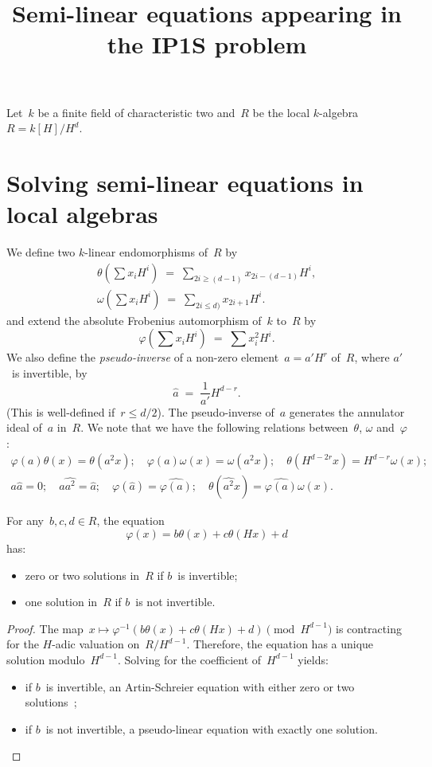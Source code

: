 \documentclass{llncs}
\begin{document}
\title{Semi-linear equations appearing in the IP1S problem}

Let~$k$ be a finite field of characteristic two and~$R$ be the local
$k$-algebra $R = k[H]/H^d$.
\section{Solving semi-linear equations in local algebras}%
We define two $k$-linear endomorphisms of~$R$
by
\begin{gather*}
θ(∑ x_i H^i) \;=\; ∑_{2i ≥ (d-1)} x_{2i-(d-1)} H^i,\\
ω(∑ x_i H^i) \;=\; ∑_{2i ≤ d)} x_{2i+1} H^{i}.
\end{gather*}
and extend the absolute Frobenius automorphism of~$k$ to~$R$ by
\begin{equation}
φ(∑ x_i H^i) \;=\; ∑ x_{i}^2 H^i.
\end{equation}
We also define the \emph{pseudo-inverse} of a non-zero element~$a = a'
H^r$ of~$R$, where $a'$~is invertible, by
\begin{equation}\label{eq:pseudo-inv}
\widehat{a} \;=\; \frac{1}{a'} H^{d-r}.
\end{equation}
(This is well-defined if~$r ≤ d/2$).
The pseudo-inverse of~$a$ generates the annulator ideal of~$a$ in~$R$.
We note that we have the following relations between~$θ$, $ω$ and~$φ$:
\begin{gather*}\label{eq:theta-omega}
φ(a) θ(x) = θ(a^2 x); \quad
φ(a) ω(x) = ω(a^2 x); \quad
θ(H^{d-2r} x) = H^{d-r} ω(x);\\
a \widehat{a} = 0; \quad a \widehat{a^2} = \widehat{a};\quad
φ(\widehat{a}) = \widehat{φ(a)};\quad
θ(\widehat{a^2} x) = \widehat{φ(a)} ω(x).
\end{gather*}


\begin{proposition}\label{prop:contracting}
For any~$b, c, d ∈ R$, the equation
\begin{equation}
φ(x) = b θ(x) + c θ(Hx) + d
\end{equation}
has:
\begin{itemize}
\item zero or two solutions in~$R$ if $b$~is invertible;
\item one solution in~$R$ if $b$~is not invertible.
\end{itemize}
\end{proposition}


\begin{proof}
The map~$x ↦  φ^{-1} (b θ(x) + c θ(Hx) + d) \pmod{H^{d-1}}$ is
contracting for the $H$-adic valuation on~$R/H^{d-1}$. Therefore, the
equation has a unique solution modulo~$H^{d-1}$. Solving for the
coefficient of~$H^{d-1}$ yields:
\begin{itemize}
\item if $b$~is invertible, an Artin-Schreier equation with either zero or
two solutions ;
\item if $b$~is not invertible, a pseudo-linear equation with exactly one
solution.
\end{itemize}
\end{proof}
\end{document}
